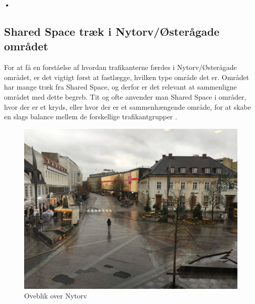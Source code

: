 \emph{•}\subsection{Shared Space træk i Nytorv/Østerågade området}
\label{omrade_sharedspace}
For at få en forståelse af hvordan trafikanterne færdes i Nytorv/Østerågade området, er det vigtigt først at fastlægge, hvilken type område det er. Området har mange træk fra Shared Space, og derfor er det relevant at sammenligne området med dette begreb.
Tit og ofte anvender man Shared Space i områder, hvor der er et kryds, eller hvor der er et sammenhængende område, for at skabe en slags balance mellem de forskellige trafikantgrupper .

\begin{figure}[htbp]
   \centering
   \begin{adjustbox}{max width=\textwidth}
     \includegraphics[scale=0.3]{figures/Billederogfigur/Nytorvoverblik.jpg}
  \end{adjustbox}
   \caption{Oveblik over Nytorv}
   \label{fig:nytorv}
 \end{figure}

